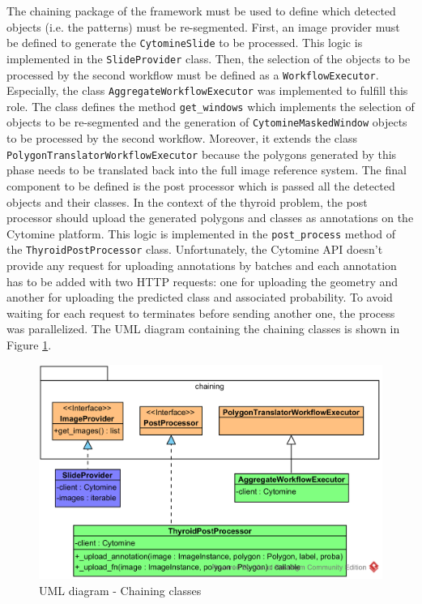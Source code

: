 The chaining package of the framework must be used to define which detected objects (i.e. the patterns) must be re-segmented. First, an image provider must be defined to generate the \texttt{CytomineSlide} to be processed. This logic is implemented in the \texttt{SlideProvider} class. Then, the selection of the objects to be processed by the second workflow must be defined as a \texttt{WorkflowExecutor}. Especially, the class \texttt{AggregateWorkflowExecutor} was implemented to fulfill this role. The class defines the method \texttt{get\_windows} which implements the selection of objects to be re-segmented and the generation of \texttt{CytomineMaskedWindow} objects to be processed by the second workflow. Moreover, it extends the class \texttt{PolygonTranslatorWorkflowExecutor} because the polygons generated by this phase needs to be translated back into the full image reference system. The final component to be defined is the post processor which is passed all the detected objects and their classes. In the context of the thyroid problem, the post processor should upload the generated polygons and classes as annotations on the Cytomine platform. This logic is implemented in the \texttt{post\_process} method of the \texttt{ThyroidPostProcessor} class. Unfortunately, the Cytomine API doesn't provide any request for uploading annotations by batches and each annotation has to be added with two HTTP requests: one for uploading the geometry and another for uploading the predicted class and associated probability. To avoid waiting for each request to terminates before sending another one, the process was parallelized. The UML diagram containing the chaining classes is shown in Figure \ref{fig:uml_cyto_chaining}.


\begin{figure}
	\center
	\includegraphics[scale=0.85]{image/thyroid_image_provider.png}
	\caption{UML diagram - Chaining classes}
	\label{fig:uml_cyto_chaining}
\end{figure}



